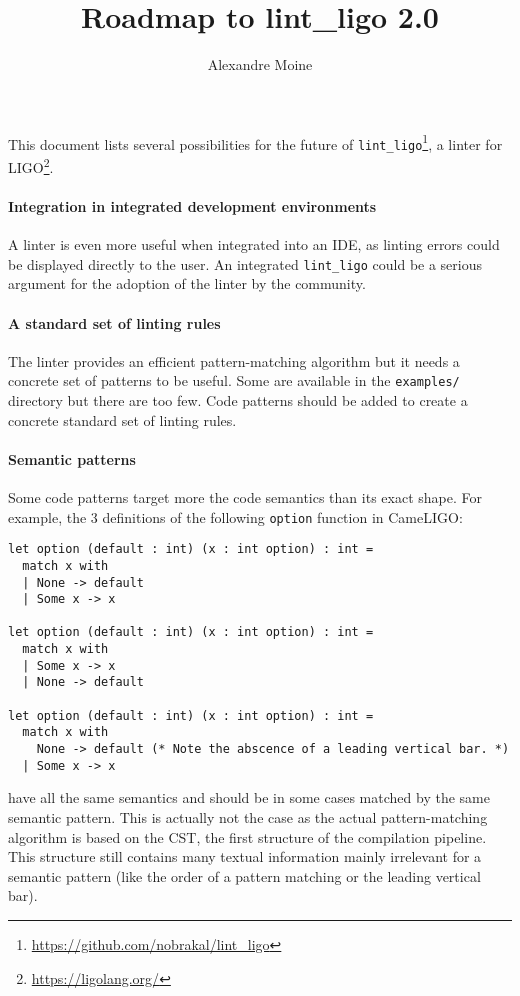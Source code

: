 \documentclass[10pt,a4paper]{article}
\author{Alexandre Moine}
\title{Roadmap to lint\_ligo 2.0}
\begin{document}
\maketitle

This document lists several possibilities for the future of \verb|lint_ligo|\footnote{\url{https://github.com/nobrakal/lint_ligo}}, a linter for LIGO\footnote{\url{https://ligolang.org/}}.

\paragraph{Integration in integrated development environments}
A linter is even more useful when integrated into an IDE, as linting errors could be displayed directly to the user.
An integrated \verb|lint_ligo| could be a serious argument for the adoption of the linter by the community.

\paragraph{A standard set of linting rules}

The linter provides an efficient pattern-matching algorithm but it needs a concrete set of patterns to be useful. Some are available in the \verb|examples/| directory but there are too few. Code patterns should be added to create a concrete standard set of linting rules.

\paragraph{Semantic patterns}
Some code patterns target more the code semantics than its exact shape. For example, the 3 definitions of the following \verb|option| function in CameLIGO:
\begin{verbatim}
let option (default : int) (x : int option) : int =
  match x with
  | None -> default
  | Some x -> x

let option (default : int) (x : int option) : int =
  match x with
  | Some x -> x
  | None -> default

let option (default : int) (x : int option) : int =
  match x with
    None -> default (* Note the abscence of a leading vertical bar. *)
  | Some x -> x
\end{verbatim}

have all the same semantics and should be in some cases matched by the same semantic pattern.
This is actually not the case as the actual pattern-matching algorithm is based on the CST, the first structure of the compilation pipeline. This structure still contains many textual information mainly irrelevant for a semantic pattern (like the order of a pattern matching or the leading vertical bar).
\end{document}
